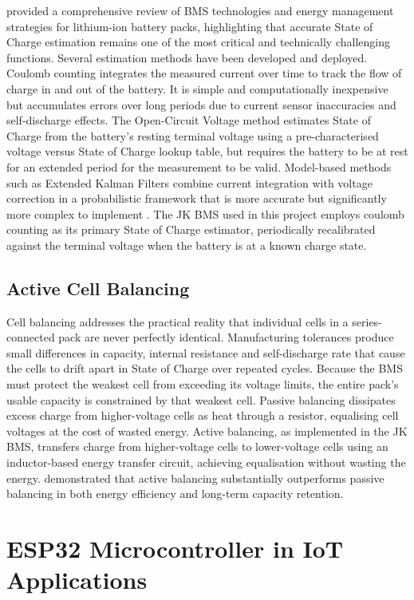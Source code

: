 \documentclass[12pt, a4paper]{report}
\begin{document}
\citet{hannan2017} provided a comprehensive review of BMS technologies and
energy management strategies for lithium-ion battery packs, highlighting
that accurate State of Charge estimation remains one of the most critical
and technically challenging functions. Several estimation methods have
been developed and deployed. Coulomb counting integrates the measured
current over time to track the flow of charge in and out of the battery.
It is simple and computationally inexpensive but accumulates errors over
long periods due to current sensor inaccuracies and self-discharge effects.
The Open-Circuit Voltage method estimates State of Charge from the
battery's resting terminal voltage using a pre-characterised voltage versus
State of Charge lookup table, but requires the battery to be at rest for
an extended period for the measurement to be valid. Model-based methods
such as Extended Kalman Filters combine current integration with voltage
correction in a probabilistic framework that is more accurate but
significantly more complex to implement \citep{piller2001}. The JK BMS
used in this project employs coulomb counting as its primary State of
Charge estimator, periodically recalibrated against the terminal voltage
when the battery is at a known charge state.

\subsection{Active Cell Balancing}

Cell balancing addresses the practical reality that individual cells in a
series-connected pack are never perfectly identical. Manufacturing
tolerances produce small differences in capacity, internal resistance and
self-discharge rate that cause the cells to drift apart in State of Charge
over repeated cycles. Because the BMS must protect the weakest cell from
exceeding its voltage limits, the entire pack's usable capacity is
constrained by that weakest cell. Passive balancing dissipates excess
charge from higher-voltage cells as heat through a resistor, equalising
cell voltages at the cost of wasted energy. Active balancing, as
implemented in the JK BMS, transfers charge from higher-voltage cells to
lower-voltage cells using an inductor-based energy transfer circuit,
achieving equalisation without wasting the energy. \citet{dini2024}
demonstrated that active balancing substantially outperforms passive
balancing in both energy efficiency and long-term capacity retention.

\section{ESP32 Microcontroller in IoT Applications}
\end{document}
